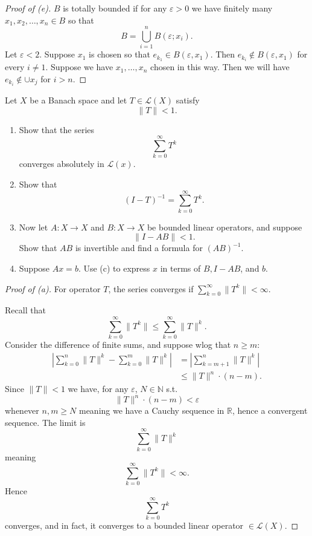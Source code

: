\begin{proof}[Proof of (e)]
    $B$ is totally bounded if for any $\varepsilon > 0$ we have 
    finitely many $x_1,x_2,\ldots,x_n \in B$ so that
    \[
        B = \bigcup_{i=1}^n B(\varepsilon;x_i).
    \]
    Let $\varepsilon < 2$. Suppose $x_1$ is chosen so that 
    $e_{k_1} \in B(\varepsilon, x_1)$. Then $e_{k_i} \not \in 
    B(\varepsilon, x_1)$ for every $i \neq 1$. 
    Suppose we have $x_1,\ldots,x_n$ chosen in this way. Then 
    we will have $e_{k_i}\not\in \cup x_j$ for $i > n$. 

\end{proof}

\begin{prob}
    Let $X$ be a Banach space and let $T \in \mathcal L(X)$ 
    satisfy 
    \[
        \|T\| < 1.
    \]

    \begin{enumerate}[label=\alph*)]
        \item Show that the series 
            \[
                \sum_{k=0}^\infty T^k
            \]
            converges absolutely in $\mathcal L(x)$.
        \item Show that 
            \[
                (I-T)^{-1}
                = 
                \sum_{k=0}^\infty T^k.
            \]
        \item Now let $A : X \to X$ and $B : X \to X$ be 
            bounded linear operators, and suppose 
            \[
                \|I-AB\| < 1.
            \] 
            Show that $AB$ is invertible and find a 
            formula for $(AB)^{-1}$.

        \item Suppose $Ax = b$. Use (c) to express $x$ in 
            terms of $B,I-AB$, and $b$.
    \end{enumerate}
\end{prob}
\begin{proof}[Proof of (a)]
    For operator $T$, the series converges 
    if $\sum_{k=0}^\infty \|T^k\| < \infty$.


    Recall that 
    \[
        \sum_{k=0}^\infty \|T^k\|
        \leq 
        \sum_{k=0}^\infty \|T\|^k.
    \]
    Consider the difference of finite sums, and suppose 
    wlog that $n \geq m$: 
    \begin{align*}
        \left|\sum_{k=0}^n \|T\|^k - \sum_{k=0}^m \|T\|^k\right|
        &= 
        \left| \sum_{k=m+1}^n \|T\|^k \right| \\ 
        &\leq \|T\|^n \cdot (n - m). 
    \end{align*}
    Since $\|T\| < 1$ we have, for any $\varepsilon$, $N \in 
    \mathbb N$ s.t. 
    \[
        \|T\|^n \cdot (n-m) < \varepsilon 
    \]
    whenever $n,m \geq N$ meaning we have a Cauchy sequence in 
    $\mathbb R$, hence a convergent sequence. The limit is 
    \[
        \sum_{k=0}^\infty \|T\|^k 
    \] 
    meaning 
    \[
        \sum_{k=0}^\infty \|T^k\| < \infty. 
    \]
    Hence 
    \[
        \sum_{k=0}^\infty T^k
    \]
    converges, and in fact, it converges to 
    a bounded linear operator $\in \mathcal L(X)$.
\end{proof}
